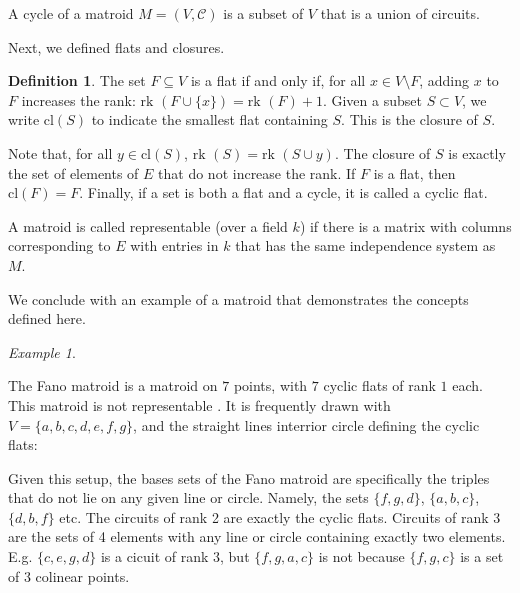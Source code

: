 \documentclass[11pt]{article}
\newcommand{\rk}{\textrm{rk }}
\newcommand{\cl}{\textrm{cl}}
\newcommand{\cC}{\mathcal{C}}
\theoremstyle{remark}
\newtheorem{eg}[thm]{Example}
\theoremstyle{definition}
\newtheorem{dfn}[thm]{Definition}
\begin{document}
A cycle of a matroid $M = (V, \cC)$ is a subset of $V$ that is a union of circuits. 

Next, we defined flats and closures. 

\begin{dfn}\label{dfn:flatclosure} The set $F \subseteq V$ is a flat if and only if, for all $x \in V \setminus F$, adding $x$ to $F$ increases the rank: $\rk(F \cup \{x\}) = \rk(F) + 1$. Given a subset $S \subset V$, we write $\cl(S)$ to indicate the smallest flat containing $S$. This is the closure of $S$.  \end{dfn}

Note that, for all $y \in \cl(S)$, $\rk(S) = \rk(S\cup y)$. The closure of $S$ is exactly the set of elements of $E$ that do not increase the rank. If $F$ is a flat, then $\cl(F) = F$. Finally, if a set is both a flat and a cycle, it is called a cyclic flat.

A matroid is called representable (over a field $k$) if there is a matrix with columns corresponding to $E$ with entries in $k$ that has the same independence system as $M$. 

We conclude with an example of a matroid that demonstrates the concepts defined here. 

\begin{eg} \label{eg:Fano} 

The Fano matroid is a matroid on $7$ points, with $7$ cyclic flats of rank $1$ each. This matroid is not representable \cite{???}. It is frequently drawn with $V = \{ a, b, c, d, e, f, g\}$, and the straight lines interrior circle defining the cyclic flats:

\begin{center}
\end{center}

 Given this setup, the bases sets of the Fano matroid are specifically the triples that do not lie on any given line or circle. Namely, the sets $\{f, g, d\}$, $\{a,b, c\}$, $\{d, b, f\}$ etc. The circuits of rank 2 are exactly the cyclic flats. Circuits of rank 3 are the sets of 4 elements with any line or circle containing exactly two elements. E.g. $\{c, e, g, d\}$ is a cicuit of rank $3$, but $\{f, g, a, c\}$ is not because $\{f, g, c\}$ is a set of $3$ colinear points. 
\end{eg}
\end{document}
